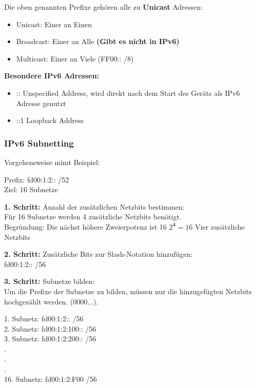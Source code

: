 \documentclass[asp1.tex]{subfiles}
\begin{document}
Die oben genannten Prefixe gehören alle zu \textbf{Unicast} Adressen:
\begin{itemize}
    \item Unicast: Einer an Einen
    \item Broadcast: Einer an Alle \textbf{(Gibt es nicht in IPv6)}
    \item Multicast: Einer an Viele (FF00:: /8)
\end{itemize}

\textbf{Besondere IPv6 Adressen:}
\begin{itemize}
    \item :: \textrightarrow\space Unspecified Address, wird direkt nach dem Start des Geräts als IPv6 Adresse genutzt
    \item ::1 \textrightarrow\space Loopback Address
\end{itemize}

\subsubsection{IPv6 Subnetting}

Vorgehensweise mimt Beispiel:

Prefix: fd00:1:2:: /52 \\
Ziel: 16 Subnetze

\textbf{1. Schritt:} Anzahl der zusätzlichen Netzbits bestimmen:\\
Für 16 Subnetze werden 4 zusätzliche Netzbits benötigt.\\
Begründung: Die nächst höhere Zweierpotenz ist 16 \textrightarrow\space \(2^\textbf{4} = 16\) \textrightarrow\space Vier zusätzliche Netzbits

\textbf{2. Schritt:} Zusätzliche Bits zur Slash-Notation hinzufügen:\\
fd00:1:2:: /56

\textbf{3. Schritt:} Subnetze bilden:\\
Um die Prefixe der Subnetze zu bilden, müssen nur die  hinzugefügten Netzbits hochgezählt werden. (0000\textrightarrow{}\textrightarrow{}\textrightarrow\space...).

1. Subnetz: fd00:1:2:: /56\\
2. Subnetz: fd00:1:2:100:: /56\\
3. Subnetz: fd00:1:2:200:: /56\\
.\\
.\\
.\\
16. Subnetz: fd00:1:2:F00 /56\\
\end{document}
